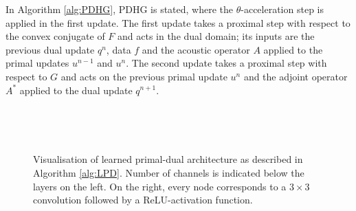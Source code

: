 \documentclass[journal]{IEEEtran}
\begin{document}
In Algorithm \ref{alg:PDHG}, PDHG is stated, where the $\theta$-acceleration step is applied in the first update. The first update takes a proximal step with respect to the convex conjugate of $F$ and acts in the dual domain; its inputs are the previous dual update $q^n$, data $f$ and the acoustic operator $A$ applied to the primal updates $u^{n-1}$ and $u^n$. The second update takes a proximal step with respect to $G$ and acts on the previous primal update $u^n$ and the adjoint operator $A^*$ applied to the dual update $q^{n+1}$. 

\vspace{3mm}
\\
\begin{minipage}{\linewidth}
$~$\vspace{-1mm} 
\end{minipage}

\begin{figure}
\resizebox{1.025\linewidth}{!}{%
\begin{tikzpicture}

\end{tikzpicture}}
\caption{Visualisation of learned primal-dual architecture as described in Algorithm \ref{alg:LPD}. Number of channels is indicated below the layers on the left. On the right, every node corresponds to a $3\times3$ convolution followed by a ReLU-activation function.}
\label{ref:recon_segm_setup}
\end{figure}
\end{document}

